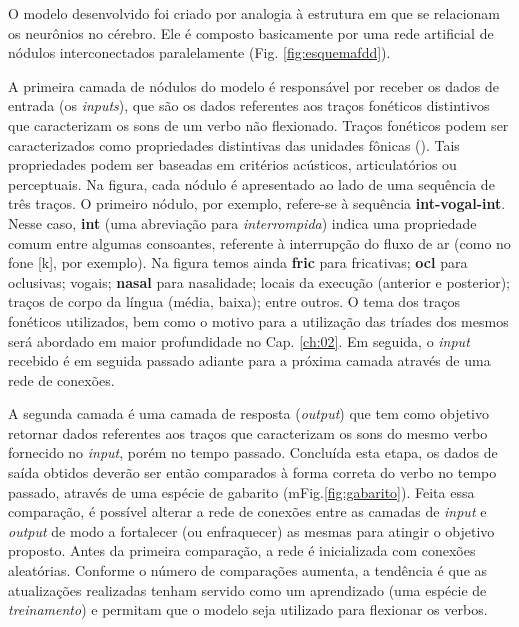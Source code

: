 


O modelo desenvolvido foi criado por analogia à estrutura em que se relacionam os neurônios no cérebro. Ele é composto basicamente por uma rede artificial de nódulos interconectados paralelamente (Fig. \ref{fig:esquemafdd}).

A primeira camada de nódulos do modelo é responsável por receber os dados de entrada (os \textit{inputs}), que são os dados referentes aos traços fonéticos distintivos que caracterizam os sons de um verbo não flexionado. Traços fonéticos podem ser caracterizados como propriedades distintivas das unidades fônicas (\cite{paraconhecer:2015}). Tais propriedades podem ser baseadas em critérios acústicos, articulatórios ou perceptuais. Na figura, cada nódulo é apresentado ao lado de uma sequência de três traços. O primeiro nódulo, por exemplo, refere-se à sequência \textbf{int-vogal-int}. Nesse caso, \textbf{int} (uma abreviação para \textit{interrompida}) indica uma propriedade comum entre algumas consoantes, referente à interrupção do fluxo de ar (como no fone [k], por exemplo). Na figura temos ainda \textbf{fric} para fricativas; \textbf{ocl} para oclusivas; vogais; \textbf{nasal} para nasalidade; locais da execução (anterior e posterior); traços de corpo da língua (média, baixa); entre outros. O tema dos traços fonéticos utilizados, bem como o motivo para a utilização das tríades dos mesmos será abordado em maior profundidade no Cap. \ref{ch:02}. Em seguida, o \textit{input} recebido é em seguida passado adiante para a próxima camada através de uma rede de conexões. 

A segunda camada é uma camada de resposta (\textit{output}) que tem como objetivo retornar dados referentes aos traços que caracterizam os sons do mesmo verbo fornecido no \textit{input}, porém no tempo passado. Concluída esta etapa, os dados de saída obtidos deverão ser então comparados à forma correta do verbo no tempo passado, através de uma espécie de gabarito (mFig.\ref{fig:gabarito}). Feita essa comparação, é possível alterar a rede de conexões entre as camadas de \textit{input} e \textit{output} de modo a fortalecer (ou enfraquecer) as mesmas para atingir o objetivo proposto. Antes da primeira comparação, a rede é inicializada com conexões aleatórias. Conforme o número de comparações aumenta, a tendência é que as atualizações realizadas tenham servido como um aprendizado (uma espécie de \textit{treinamento}) e permitam que o modelo seja utilizado para flexionar os verbos.



